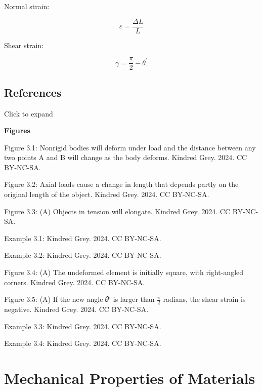 \documentclass[
  letterpaper,
  DIV=11,
  numbers=noendperiod]{scrreprt}
\theoremstyle{definition}
\theoremstyle{remark}
\begin{document}
\begin{tcolorbox}[enhanced jigsaw, leftrule=.75mm, bottomrule=.15mm, opacityback=0, opacitybacktitle=0.6, colframe=quarto-callout-note-color-frame, toprule=.15mm, colbacktitle=quarto-callout-note-color!10!white, coltitle=black, bottomtitle=1mm, title={Key equations}, titlerule=0mm, toptitle=1mm, colback=white, rightrule=.15mm, left=2mm, arc=.35mm, breakable]

Normal strain:

\[
\varepsilon=\frac{\Delta L}{L}
\]

Shear strain:

\[
\gamma=\frac{\pi}{2}-\theta^{\prime}
\]

\end{tcolorbox}

\section*{References}\label{references-2}


Click to expand

\textbf{Figures}

Figure 3.1: Nonrigid bodies will deform under load and the distance
between any two points A and B will change as the body deforms. Kindred
Grey. 2024. CC BY-NC-SA.

Figure 3.2: Axial loads cause a change in length that depends partly on
the original length of the object. Kindred Grey. 2024. CC BY-NC-SA.

Figure 3.3: (A) Objects in tension will elongate. Kindred Grey. 2024. CC
BY-NC-SA.

Example 3.1: Kindred Grey. 2024. CC BY-NC-SA.

Example 3.2: Kindred Grey. 2024. CC BY-NC-SA.

Figure 3.4: (A) The undeformed element is initially square, with
right-angled corners. Kindred Grey. 2024. CC BY-NC-SA.

Figure 3.5: (A) If the new angle 𝜃' is larger than \(\frac{\pi}{2}\)
radians, the shear strain is negative. Kindred Grey. 2024. CC BY-NC-SA.

Example 3.3: Kindred Grey. 2024. CC BY-NC-SA.

Example 3.4: Kindred Grey. 2024. CC BY-NC-SA.


\chapter{Mechanical Properties of
Materials}\label{sec-mechanical-properties-of-materials}
\end{document}
